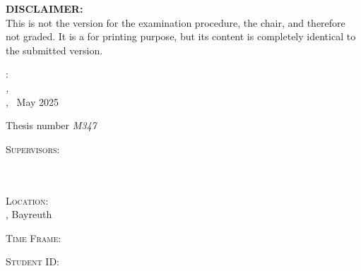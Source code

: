 
\begingroup
\thispagestyle{empty}

\hfill
\vspace{2cm}

\begin{minipage}[l]{.7\textwidth}
    \textbf{DISCLAIMER:}\\
    This is not the version for the examination procedure, the chair, and therefore not graded. It is a for printing purpose, but its content is completely identical to the submitted version.
\end{minipage}

\vfill

\autor:\\
\textit{\titel,} \\
\arbeit, \textcopyright~May 2025
\medskip

Thesis number {\itshape M347}
\bigskip

\textsc{Supervisors}: \\
\betreuer \\
\betreuerzwei \\ 
\gutachter
\medskip

\textsc{Location}: \\
\abgabeort, Bayreuth
\medskip

\textsc{Time Frame}: \\
\zeitraum
\medskip

\textsc{Student ID}: \\
\matrikelnr

\endgroup


